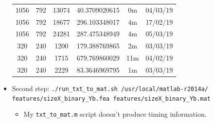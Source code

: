 \documentclass[11pt,a4paper]{report}
\begin{document}
\begin{itemize}
\begin{center}
\begin{tabular}{ c c c | c c c }
  1056 & 792 & 13074 & 40.3709020615 & 0m & 04/03/19 \\
  1056 & 792 & 18677 & 296.103348017 & 4m & 17/02/19 \\
  1056 & 792 & 24281 & 287.475348949 & 4m & 05/03/19 \\
  320 & 240 & 1200 & 179.388769865 & 2m & 03/03/19 \\
  320 & 240 & 1715 & 679.769860029 & 11m & 04/02/19 \\
  320 & 240 & 2229 & 83.3646969795 & 1m & 03/03/19 \\
  \end{tabular}
  \end{center}

\item Second step: \texttt{./run\_txt\_to\_mat.sh /usr/local/matlab-r2014a/} \\
         \texttt{features/sizeX\_binary\_Yb.fea features/sizeX\_binary\_Yb.mat}
  \begin{itemize}
  \item My \texttt{txt\_to\_mat.m} script doesn't produce timing information.
  \end{itemize}
\end{itemize}

\newpage
\end{document}
